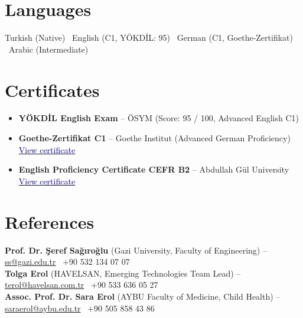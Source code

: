 \documentclass[10pt, a4paper]{article}
\begin{document}
\section{Languages}
{\small Turkish (Native) \textbullet\ English (C1, Y\"{O}KD\.{I}L: 95) \textbullet\ German (C1, Goethe-Zertifikat) \textbullet\ Arabic (Intermediate)}

\section{Certificates}
\begin{itemize}
    \item \textbf{Y\"{O}KD\.{I}L English Exam} -- \"{O}SYM (Score: 95 / 100, Advanced English C1)
    \item \textbf{Goethe-Zertifikat C1} -- Goethe Institut (Advanced German Proficiency) \href{https://drive.google.com/file/d/1cp37JZdfWIg2Qls7ufMm9iRPQu8bJT77/view?usp=sharing}{\textcolor{darkblue}{View certificate}}
    \item \textbf{English Proficiency Certificate CEFR B2} -- Abdullah G\"{u}l University \href{https://drive.google.com/file/d/1mAhNtJmdMGiNpowb0sVMybRPiWGNEBsa/view?usp=sharing}{\textcolor{darkblue}{View certificate}}
\end{itemize}

\section{References}
{\small
\textbf{Prof. Dr. \c{S}eref Sa\u{g}\i ro\u{g}lu} (Gazi University, Faculty of Engineering) -- \href{mailto:ss@gazi.edu.tr}{ss@gazi.edu.tr} \textbar\ +90 532 134 07 07\\
\textbf{Tolga Erol} (HAVELSAN, Emerging Technologies Team Lead) -- \href{mailto:terol@havelsan.com.tr}{terol@havelsan.com.tr} \textbar\ +90 533 636 05 27\\
\textbf{Assoc. Prof. Dr. Sara Erol} (AYBU Faculty of Medicine, Child Health) -- \href{mailto:saraerol@aybu.edu.tr}{saraerol@aybu.edu.tr} \textbar\ +90 505 858 43 86
}
\end{document}
